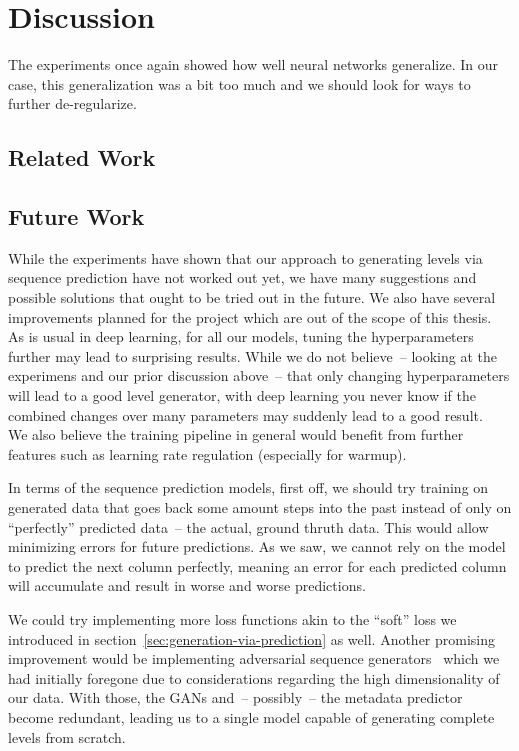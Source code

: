 \section{Discussion}

The experiments once again showed how well neural networks generalize.
In our case, this generalization was a bit too much and we should look
for ways to further de-regularize.

\subsection{Related Work}



\subsection{Future Work}

While the experiments have shown that our approach to generating
levels via sequence prediction have not worked out yet, we have many
suggestions and possible solutions that ought to be tried out in the
future. We also have several improvements planned for the project
which are out of the scope of this thesis. \\
As is usual in deep learning, for all our models, tuning the
hyperparameters further may lead to surprising results. While we do
not believe~-- looking at the experimens and our prior discussion
above~-- that only changing hyperparameters will lead to a good level
generator, with deep learning you never know if the combined changes
over many parameters may suddenly lead to a good result. \\
We also believe the training pipeline in general would benefit from
further features such as learning rate regulation (especially for
warmup).

In terms of the sequence prediction models, first off, we should try
training on generated data that goes back some amount steps into the
past instead of only on %
``perfectly'' predicted data~-- the actual, ground thruth data. This
would allow minimizing errors for future predictions. As we saw, we
cannot rely on the model to predict the next column perfectly, meaning
an error for each predicted column will accumulate and result in worse
and worse predictions.

We could try implementing more loss functions akin to the ``soft''
loss we introduced in section~\ref{sec:generation-via-prediction} as
well. Another promising improvement would be implementing adversarial
sequence
generators~\cite{yuSeqGANSequenceGenerative2017,liAdversarialDiscreteSequence}
which we had initially foregone due to considerations regarding the
high dimensionality of our data. With those, the GANs and~-- possibly~--
the metadata predictor become redundant, leading us to a single model
capable of generating complete levels from scratch.



